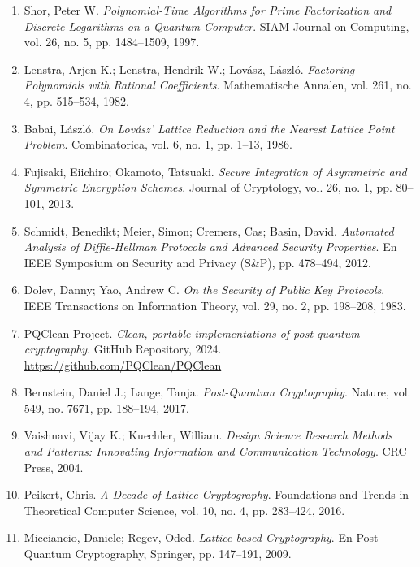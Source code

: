 \documentclass[11pt,a4paper,twoside,openright]{book}
\theoremstyle{plain}
\theoremstyle{definition}
\theoremstyle{remark}
\begin{document}
\begin{enumerate}
  \item Shor, Peter W. \textit{Polynomial-Time Algorithms for Prime Factorization and Discrete Logarithms on a Quantum Computer}. SIAM Journal on Computing, vol. 26, no. 5, pp. 1484--1509, 1997.
  
  \item Lenstra, Arjen K.; Lenstra, Hendrik W.; Lov\'asz, L\'aszl\'o. \textit{Factoring Polynomials with Rational Coefficients}. Mathematische Annalen, vol. 261, no. 4, pp. 515--534, 1982.
  
  \item Babai, L\'aszl\'o. \textit{On Lov\'asz' Lattice Reduction and the Nearest Lattice Point Problem}. Combinatorica, vol. 6, no. 1, pp. 1--13, 1986.
  
  \item Fujisaki, Eiichiro; Okamoto, Tatsuaki. \textit{Secure Integration of Asymmetric and Symmetric Encryption Schemes}. Journal of Cryptology, vol. 26, no. 1, pp. 80--101, 2013.
  
  \item Schmidt, Benedikt; Meier, Simon; Cremers, Cas; Basin, David. \textit{Automated Analysis of Diffie-Hellman Protocols and Advanced Security Properties}. En IEEE Symposium on Security and Privacy (S\&P), pp. 478--494, 2012.
  
  \item Dolev, Danny; Yao, Andrew C. \textit{On the Security of Public Key Protocols}. IEEE Transactions on Information Theory, vol. 29, no. 2, pp. 198--208, 1983.
  
  \item PQClean Project. \textit{Clean, portable implementations of post-quantum cryptography}. GitHub Repository, 2024. \url{https://github.com/PQClean/PQClean}
  
  \item Bernstein, Daniel J.; Lange, Tanja. \textit{Post-Quantum Cryptography}. Nature, vol. 549, no. 7671, pp. 188--194, 2017.
  
  \item Vaishnavi, Vijay K.; Kuechler, William. \textit{Design Science Research Methods and Patterns: Innovating Information and Communication Technology}. CRC Press, 2004.
  
  \item Peikert, Chris. \textit{A Decade of Lattice Cryptography}. Foundations and Trends in Theoretical Computer Science, vol. 10, no. 4, pp. 283--424, 2016.
  
  \item Micciancio, Daniele; Regev, Oded. \textit{Lattice-based Cryptography}. En Post-Quantum Cryptography, Springer, pp. 147--191, 2009.
\end{enumerate}

\printindex
\end{document}
